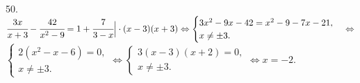 50. $\cfrac{3x}{x+3}-\cfrac{42}{x^2-9}=1+\cfrac{7}{3-x}\Big|\cdot(x-3)(x+3)\Leftrightarrow\begin{cases}3x^2-9x-42=x^2-9-7x-21,\\x\neq\pm3.\end{cases}
\Leftrightarrow$\\$\begin{cases}2(x^2-x-6)=0,\\x\neq\pm3.\end{cases}\Leftrightarrow\begin{cases}3(x-3)(x+2)=0,\\x\neq\pm3.\end{cases}\Leftrightarrow x=-2.$\\

